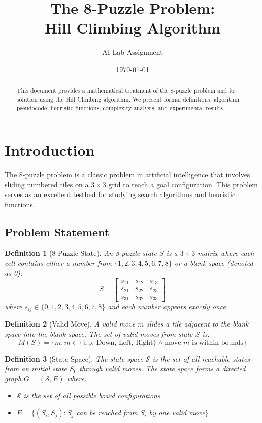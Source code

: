 \documentclass[12pt,a4paper]{article}
\title{The 8-Puzzle Problem: \\
       Hill Climbing Algorithm}
\author{AI Lab Assignment}
\date{\today}
\newtheorem{definition}{Definition}
\begin{document}
\maketitle

\begin{abstract}
This document provides a mathematical treatment of the 8-puzzle problem and its solution using the Hill Climbing algorithm. We present formal definitions, algorithm pseudocode, heuristic functions, complexity analysis, and experimental results.
\end{abstract}

\tableofcontents
\newpage

\section{Introduction}

The 8-puzzle problem is a classic problem in artificial intelligence that involves sliding numbered tiles on a $3 \times 3$ grid to reach a goal configuration. This problem serves as an excellent testbed for studying search algorithms and heuristic functions.

\subsection{Problem Statement}

\begin{definition}[8-Puzzle State]
An 8-puzzle state $S$ is a $3 \times 3$ matrix where each cell contains either a number from $\{1, 2, 3, 4, 5, 6, 7, 8\}$ or a blank space (denoted as 0):
\[
S = \begin{bmatrix}
s_{11} & s_{12} & s_{13} \\
s_{21} & s_{22} & s_{23} \\
s_{31} & s_{32} & s_{33}
\end{bmatrix}
\]
where $s_{ij} \in \{0, 1, 2, 3, 4, 5, 6, 7, 8\}$ and each number appears exactly once.
\end{definition}

\begin{definition}[Valid Move]
A valid move $m$ slides a tile adjacent to the blank space into the blank space. The set of valid moves from state $S$ is:
\[
M(S) = \{m : m \in \{\text{Up, Down, Left, Right}\} \land \text{move } m \text{ is within bounds}\}
\]
\end{definition}

\begin{definition}[State Space]
The state space $\mathcal{S}$ is the set of all reachable states from an initial state $S_0$ through valid moves. The state space forms a directed graph $G = (\mathcal{S}, E)$ where:
\begin{itemize}
    \item $\mathcal{S}$ is the set of all possible board configurations
    \item $E = \{(S_i, S_j) : S_j$ can be reached from $S_i$ by one valid move$\}$
\end{itemize}
\end{definition}
\end{document}
